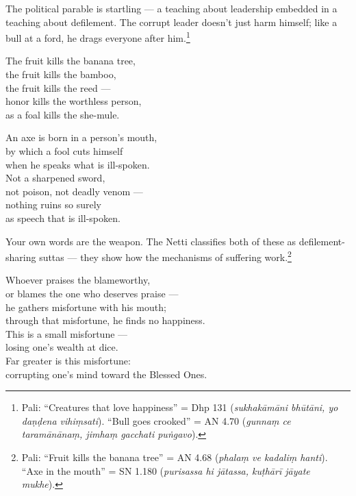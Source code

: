 \noindent The political parable is startling --- a teaching about leadership embedded in a teaching about defilement. The corrupt leader doesn't just harm himself; like a bull at a ford, he drags everyone after him.\footnote{Pali: ``Creatures that love happiness'' = Dhp 131 (\textit{sukhakāmāni bhūtāni, yo daṇḍena vihiṃsati}). ``Bull goes crooked'' = AN 4.70 (\textit{gunnaṃ ce taramānānaṃ, jimhaṃ gacchati puṅgavo}).}

\begin{versebox}
The fruit kills the banana tree,\\
the fruit kills the bamboo,\\
the fruit kills the reed ---\\
honor kills the worthless person,\\
as a foal kills the she-mule.
\end{versebox}

\begin{versebox}
An axe is born in a person's mouth,\\
by which a fool cuts himself\\
when he speaks what is ill-spoken.\\[6pt]
Not a sharpened sword,\\
not poison, not deadly venom ---\\
nothing ruins so surely\\
as speech that is ill-spoken.
\end{versebox}

\noindent Your own words are the weapon. The Netti classifies both of these as defilement-sharing suttas --- they show how the mechanisms of suffering work.\footnote{Pali: ``Fruit kills the banana tree'' = AN 4.68 (\textit{phalaṃ ve kadaliṃ hanti}). ``Axe in the mouth'' = SN 1.180 (\textit{purisassa hi jātassa, kuṭhārī jāyate mukhe}).}

\begin{versebox}
Whoever praises the blameworthy,\\
or blames the one who deserves praise ---\\
he gathers misfortune with his mouth;\\
through that misfortune, he finds no happiness.\\[6pt]
This is a small misfortune ---\\
losing one's wealth at dice.\\
Far greater is this misfortune:\\
corrupting one's mind toward the Blessed Ones.
\end{versebox}

